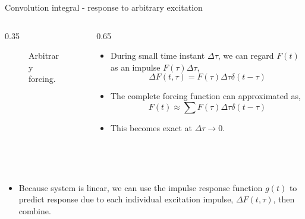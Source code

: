 \documentclass[11pt,aspectratio=169,handout]{beamer}
\begin{document}
\begin{frame}[c]{Convolution integral - response to arbitrary excitation}
	\begin{columns}[T]
		\begin{column}{0.35\textwidth}
			\begin{figure}
				\vspace{-0.5cm}
				\centering
				
				\vspace{-0.4cm}
				\caption{Arbitrary forcing.}
			\end{figure}
		\end{column}
		\begin{column}{0.65\textwidth}			
			\begin{itemize}
				\item<1-> During small time instant $\Delta \tau$, we can regard $F(t)$ as an impulse $F(\tau)\Delta \tau$,
				\begin{equation}
					\Delta F(t,\tau) = F(\tau) \Delta \tau \delta(t-\tau)
				\end{equation}
			\item<2-> The complete forcing function can approximated as, 
			\begin{equation}
				F(t)\approx \sum F(\tau) \Delta \tau \delta(t-\tau)
			\end{equation}
			\item<3-> This becomes exact at $\Delta \tau \rightarrow 0$.
			\end{itemize}
				\begin{equation}\nonumber
			\phantom{x(t) = \int_0^t F(\tau)  g(t-\tau) d\tau}
		\end{equation}
		\end{column}
	\end{columns}
	\begin{itemize}
		\item<4->  Because system is linear, we can use the impulse response function $g(t)$ to predict response due to each individual excitation impulse, $\Delta F(t,\tau)$, then combine.
	\end{itemize}
\end{frame}
\end{document}
